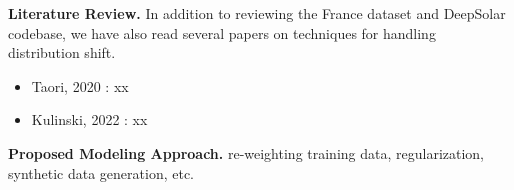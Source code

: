 \documentclass{article}
\begin{document}
\textbf{Literature Review.}
In addition to reviewing the France dataset and DeepSolar codebase, we have also read several papers on techniques for handling distribution shift.

\begin{itemize}
    \item Taori, 2020 \cite{Taori2020}: xx
    \item Kulinski, 2022 \cite{Kulinski2022}: xx
\end{itemize}

\textbf{Proposed Modeling Approach.} 
re-weighting training data, regularization, synthetic data generation, etc.





\end{document}
